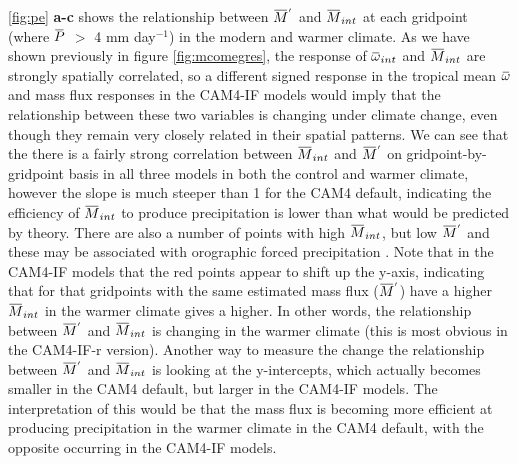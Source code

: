 \documentclass[letterpaper,12pt,titlepage,oneside,final]{book}
\newcommand{\overbar}[1]{\mkern 1.5mu\overline{\mkern-1.5mu#1\mkern-1.5mu}\mkern 1.5mu}
\begin{document}
\ref{fig:pe} \textbf{a-c} shows the relationship between $\overbar{M}^{'}$ and $\overbar{M}_{int}$ at each gridpoint (where $\overbar{P}$ $>$ 4 mm day$^{-1}$) in the modern and warmer climate. As we have shown previously in figure \ref{fig:mcomegres}, the response of $\overbar{\omega}_{int}$ and $\overbar{M}_{int}$ are strongly spatially correlated, so a different signed response in the tropical mean $\overbar{\omega}$ and mass flux responses in the CAM4-IF models would imply that the relationship between these two variables is changing under climate change, even though they remain very closely related in their spatial patterns. We can see that the there is a fairly strong correlation between $\overbar{M}_{int}$ and $\overbar{M}^{'}$  on gridpoint-by-gridpoint basis in all three models in both the control and warmer climate, however the slope is much steeper than 1 for the CAM4 default, indicating the efficiency of $\overbar{M}_{int}$ to produce precipitation is lower than what would be predicted by theory. There are also a number of points with high $\overbar{M}_{int}$, but low $\overbar{M}^{'}$ and these may be associated with orographic forced precipitation \citep{chadwick_spatial_2012}. Note that in the CAM4-IF models that the red points appear to shift up the y-axis, indicating that for that gridpoints with the same estimated mass flux ($\overbar{M}^{'}$) have a higher $\overbar{M}_{int}$ in the warmer climate gives a higher. In other words, the relationship between $\overbar{M}^{'}$ and $\overbar{M}_{int}$ is changing in the warmer climate (this is most obvious in the CAM4-IF-r version). Another way to measure the change the relationship between $\overbar{M}^{'}$ and $\overbar{M}_{int}$ is looking at the y-intercepts, which actually becomes smaller in the CAM4 default, but larger in the CAM4-IF models. The interpretation of this would be that the mass flux is becoming more efficient at producing precipitation in the warmer climate in the CAM4 default, with the opposite occurring in the CAM4-IF models.
\end{document}
